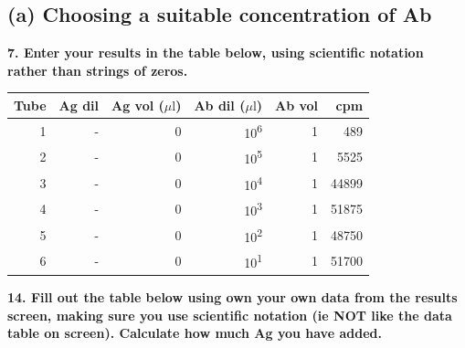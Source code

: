 \documentclass[
]{article}
\begin{document}
\hypertarget{a-choosing-a-suitable-concentration-of-ab}{%
\subsection*{(a) Choosing a suitable concentration of Ab}\label{a-choosing-a-suitable-concentration-of-ab}}

\textbf{7. Enter your results in the table below, using scientific notation rather than strings of zeros.}

\begin{longtable}[]{@{}rrrrrr@{}}
\toprule
Tube & Ag dil & Ag vol (\(\mu\text{l}\)) & Ab dil (\(\mu\text{l}\)) & Ab vol & cpm\tabularnewline
\midrule
\endhead
1 & - & 0 & 10\textsuperscript{6} & 1 & 489\tabularnewline
2 & - & 0 & 10\textsuperscript{5} & 1 & 5525\tabularnewline
3 & - & 0 & 10\textsuperscript{4} & 1 & 44899\tabularnewline
4 & - & 0 & 10\textsuperscript{3} & 1 & 51875\tabularnewline
5 & - & 0 & 10\textsuperscript{2} & 1 & 48750\tabularnewline
6 & - & 0 & 10\textsuperscript{1} & 1 & 51700\tabularnewline
\bottomrule
\end{longtable}

\textbf{14. Fill out the table below using own your own data from the results screen, making sure you use scientific notation (ie NOT like the data table on screen). Calculate how much Ag you have added.}
\end{document}
